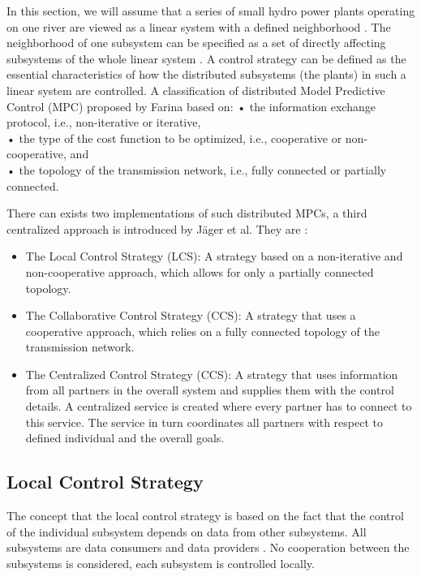  In this section, we will assume that a series of small hydro power plants operating on one river are viewed as a linear system with a defined neighborhood \cite{farina2012distributed}. The neighborhood of one subsystem can be specified as a set of directly affecting subsystems of the whole linear system \cite{farina2012distributed}. A control strategy can be defined as the essential characteristics of how the distributed subsystems (the plants) in such a linear system are controlled. A classification of distributed Model Predictive Control (MPC) proposed by Farina \cite{farina2012distributed} based on:
\indent • the information exchange protocol, i.e., non-iterative or iterative,\\
\indent • the type of the cost function to be optimized, i.e., cooperative or non-cooperative, and\\
\indent • the topology of the transmission network, i.e., fully connected or partially connected.

There can exists two implementations of such distributed MPCs, a third centralized approach is introduced by Jäger et al. \cite{SEIT2017} They are \cite{SEIT2017}:
\begin{itemize}
	\item The Local Control Strategy (LCS): A strategy based on a non-iterative and non-cooperative approach, which allows for only a partially connected topology.
	\item The Collaborative Control Strategy (CCS): A strategy that uses a cooperative approach, which relies on a fully connected topology of the transmission network.
	\item The Centralized Control Strategy (CCS): A strategy that uses information from all partners in the overall system and supplies them with the control details. A centralized service is created where every partner has to connect to this service. The service in turn coordinates all partners with respect to defined individual and the overall goals.
\end{itemize}
\subsection{Local Control Strategy}
The concept that the local control strategy is based on the fact that the control of the individual subsystem depends on data from other subsystems. All subsystems are data consumers and data providers \cite{SEIT2017}. No cooperation between the subsystems is considered, each subsystem is controlled locally. 

